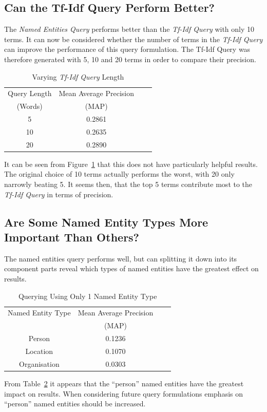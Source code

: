 \documentclass{l4proj}
\begin{document}
\subsection{Can the Tf-Idf Query Perform Better?}
The \textit{Named Entities Query} performs better than the \textit{Tf-Idf Query} with only 10 terms. It can now be considered whether the number of terms in the \textit{Tf-Idf Query} can improve the performance of this query formulation. The Tf-Idf Query was therefore generated with 5, 10 and 20 terms in order to compare their precision.
\begin{table}[H]
\centering
\begin{tabular}{|c|c|c|c|}
\hline
Query Length 	& Mean Average Precision	\\ 
(Words) 		& (MAP) 					\\ \hline
5             	& 0.2861 					\\ \hline
10        		& 0.2635 					\\ \hline
20 				& 0.2890 					\\ \hline
\end{tabular}
\caption{Varying \textit{Tf-Idf Query} Length}
\label{tfidflengthresults}
\end{table}
It can be seen from Figure~\ref{tfidflengthresults} that this does not have particularly helpful results. The original choice of 10 terms actually performs the worst, with 20 only narrowly beating 5. It seems then, that the top 5 terms contribute most to the \textit{Tf-Idf Query} in terms of precision.
\subsection{Are Some Named Entity Types More Important Than Others?}
The named entities query performs well, but can splitting it down into its component parts reveal which types of named entities have the greatest effect on results.
\begin{table}[H]
\centering
\begin{tabular}{|c|c|c|c|}
\hline
Named Entity Type 	& Mean Average Precision	\\ 
					& (MAP) 					\\ \hline
Person          	& 0.1236 					\\ \hline
Location			& 0.1070 					\\ \hline
Organisation 		& 0.0303 					\\ \hline
\end{tabular}
\caption{Querying Using Only 1 Named Entity Type}
\label{namedentityresults}
\end{table}
From Table~\ref{namedentityresults} it appears that the ``person'' named entities have the greatest impact on results. When considering future query formulations emphasis on ``person'' named entities should be increased.
\end{document}

